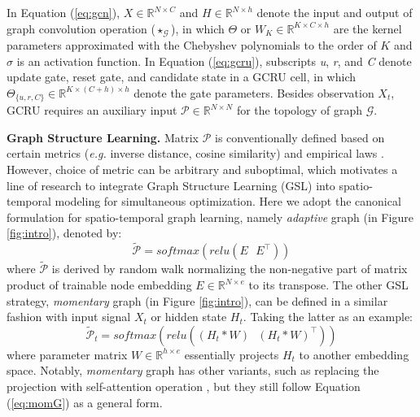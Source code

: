 \documentclass[letterpaper]{article} \usepackage{aaai23}  \usepackage{times}  \usepackage{helvet}  \usepackage{courier}  \usepackage[hyphens]{url}  \usepackage{graphicx} \urlstyle{rm} \def\UrlFont{\rm}  \usepackage{natbib}  \usepackage{caption} \usepackage{multirow}
\begin{document}
In Equation (\ref{eq:gcn}), $X \in \mathbb{R}^{N \times C}$ and $H \in \mathbb{R}^{N \times h}$ denote the input and output of graph convolution operation ($\star_\mathcal{G}$), in which $\Theta$ or $W_K \in \mathbb{R}^{K \times C \times h}$ are the kernel parameters approximated with the Chebyshev polynomials to the order of $K$ \cite{defferrard2016convolutional} and $\sigma$ is an activation function. In Equation (\ref{eq:gcru}), subscripts \textit{u}, \textit{r}, and \textit{C} denote update gate, reset gate, and candidate state in a GCRU cell, in which $\Theta_{\{u,r,C\}} \in \mathbb{R}^{K \times (C+h) \times h}$ denote the gate parameters. Besides observation $X_t$, GCRU requires an auxiliary input $\mathcal{P} \in \mathbb{R}^{N \times N}$ for the topology of graph $\mathcal{G}$.

\noindent\textbf{Graph Structure Learning.} Matrix $\mathcal{P}$ is conventionally defined based on certain metrics (\textit{e.g.} inverse distance, cosine similarity) and empirical laws \cite{yu2018spatio, li2018diffusion, geng2019spatiotemporal}. However, choice of metric can be arbitrary and suboptimal, which motivates a line of research \cite{wu2020connecting, zhang2020spatio, shang2021discrete, bai2020adaptive, ye2021coupled} to integrate Graph Structure Learning (GSL) into spatio-temporal modeling for simultaneous optimization. Here we adopt the canonical formulation \cite{wu2019graph, bai2020adaptive, wang2022event} for spatio-temporal graph learning, namely \textit{adaptive} graph (in Figure \ref{fig:intro}), denoted by:
\begin{equation} \label{eq:adaG}
	\tilde{\mathcal{P}} = softmax(relu(E \textit{ } E^{\top}))
\end{equation}
where $\tilde{\mathcal{P}}$ is derived by random walk normalizing the non-negative part of matrix product of trainable node embedding $E \in \mathbb{R}^{N \times e}$ to its transpose. The other GSL strategy, \textit{momentary} graph \cite{zhang2020spatio} (in Figure \ref{fig:intro}), can be defined in a similar fashion with input signal $X_t$ or hidden state $H_t$. Taking the latter as an example:
\begin{equation} \label{eq:momG}
    \tilde{\mathcal{P}}_t = softmax(relu((H_t * W) \textit{ } (H_t * W)^{\top}))
\end{equation}
where parameter matrix $W \in \mathbb{R}^{h \times e}$ essentially projects $H_t$ to another embedding space. Notably, \textit{momentary} graph has other variants, such as replacing the projection with self-attention operation \cite{cao2020spectral}, but they still follow Equation (\ref{eq:momG}) as a general form.
\end{document}
